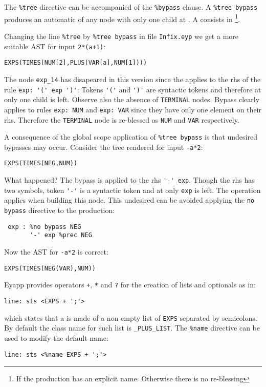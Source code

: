 The \verb|%tree| directive can be accompanied of the \verb|%bypass|
clause.  A \verb|%tree bypass| produces an automatic  of any
node with only one child at . 
A  consists in \footnote{If the production has an
explicit name. Otherwise there is no re-blessing}. 

Changing the line \verb|%tree| by \verb|%tree bypass|
in file \verb|Infix.eyp| we get a more suitable 
AST for input \verb|2*(a+1)|:
 
\begin{verbatim}
EXPS(TIMES(NUM[2],PLUS(VAR[a],NUM[1])))
\end{verbatim}

The node \verb|exp_14| has disapeared in this version
since the  applies to the rhs 
of the rule \verb|exp: '(' exp ')'|:
Tokens \verb|'('| and \verb|')'| are syntactic tokens
and therefore at 
only one child is left. Observe also the absence 
of \verb|TERMINAL| nodes. Bypass clearly applies
to rules \verb|exp: NUM| and \verb|exp: VAR| since
they have only one element on their rhs. Therefore the
\verb|TERMINAL| node is re-blessed as \verb|NUM| and
\verb|VAR| respectively.


A consequence of the global scope application of \verb|%tree bypass|
is that undesired bypasses may occur. Consider the tree 
rendered for input \verb|-a*2|:

\begin{verbatim}
EXPS(TIMES(NEG,NUM))
\end{verbatim}

What happened? The bypass is applied to the rhs 
\verb|'-' exp|.  Though the rhs has two symbols, token \verb|'-'| is
a syntactic token and at 
only \verb|exp| is left. The 
operation applies when building this node.
This undesired  can be avoided applying 
the \verb|no bypass| directive to the 
production:

\begin{verbatim}
 exp : %no bypass NEG
       '-' exp %prec NEG
\end{verbatim}
Now the AST for \verb|-a*2| is correct:
\begin{verbatim}
EXPS(TIMES(NEG(VAR),NUM))
\end{verbatim}

Eyapp provides operators \verb|+|, \verb|*| and \verb|?| 
for the creation of lists and optionals as in:
\begin{verbatim}
line: sts <EXPS + ';'>
\end{verbatim}
which states that a  is made of a non empty
list of \verb|EXPS| separated by semicolons.
By default the class name for such list is \verb|_PLUS_LIST|.
The \verb|%name| directive can be used to modify
the default name:
\begin{verbatim}
line: sts <%name EXPS + ';'>
\end{verbatim}

